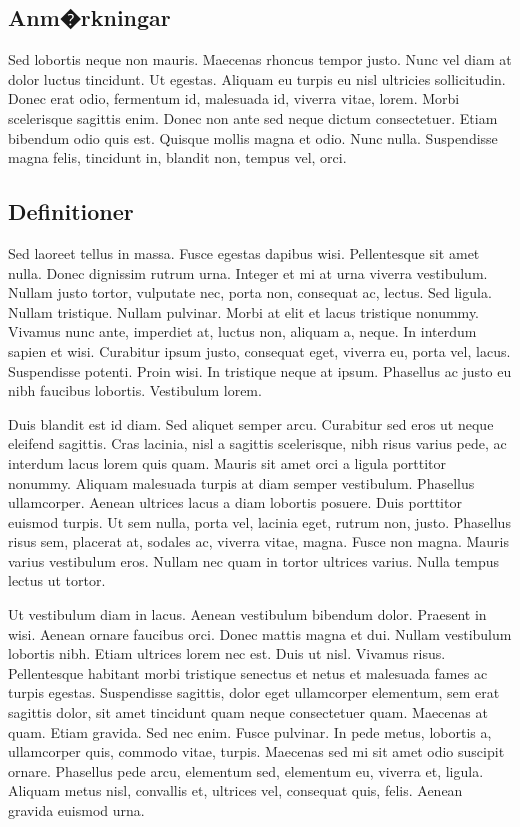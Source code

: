 \documentclass[a4paper,11pt]{kth-mag}
\begin{document}
\subsection{Anm�rkningar}

Sed lobortis neque non mauris. Maecenas rhoncus tempor justo. Nunc vel
diam at dolor luctus tincidunt. Ut egestas. Aliquam eu turpis eu nisl
ultricies sollicitudin. Donec erat odio, fermentum id, malesuada id,
viverra vitae, lorem. Morbi scelerisque sagittis enim. Donec non ante
sed neque dictum consectetuer. Etiam bibendum odio quis est. Quisque
mollis magna et odio. Nunc nulla. Suspendisse magna felis, tincidunt
in, blandit non, tempus vel, orci.

\subsection{Definitioner}

Sed laoreet tellus in massa. Fusce egestas dapibus wisi. Pellentesque
sit amet nulla. Donec dignissim rutrum urna. Integer et mi at urna
viverra vestibulum. Nullam justo tortor, vulputate nec, porta non,
consequat ac, lectus. Sed ligula. Nullam tristique. Nullam pulvinar.
Morbi at elit et lacus tristique nonummy. Vivamus nunc ante, imperdiet
at, luctus non, aliquam a, neque. In interdum sapien et wisi.
Curabitur ipsum justo, consequat eget, viverra eu, porta vel, lacus.
Suspendisse potenti. Proin wisi. In tristique neque at ipsum.
Phasellus ac justo eu nibh faucibus lobortis. Vestibulum lorem.

Duis blandit est id diam. Sed aliquet semper arcu. Curabitur sed eros
ut neque eleifend sagittis. Cras lacinia, nisl a sagittis scelerisque,
nibh risus varius pede, ac interdum lacus lorem quis quam. Mauris sit
amet orci a ligula porttitor nonummy. Aliquam malesuada turpis at diam
semper vestibulum. Phasellus ullamcorper. Aenean ultrices lacus a diam
lobortis posuere. Duis porttitor euismod turpis. Ut sem nulla, porta
vel, lacinia eget, rutrum non, justo. Phasellus risus sem, placerat
at, sodales ac, viverra vitae, magna. Fusce non magna. Mauris varius
vestibulum eros. Nullam nec quam in tortor ultrices varius. Nulla
tempus lectus ut tortor.

Ut vestibulum diam in lacus. Aenean vestibulum bibendum dolor.
Praesent in wisi. Aenean ornare faucibus orci. Donec mattis magna et
dui. Nullam vestibulum lobortis nibh. Etiam ultrices lorem nec est.
Duis ut nisl. Vivamus risus. Pellentesque habitant morbi tristique
senectus et netus et malesuada fames ac turpis egestas. Suspendisse
sagittis, dolor eget ullamcorper elementum, sem erat sagittis dolor,
sit amet tincidunt quam neque consectetuer quam. Maecenas at quam.
Etiam gravida. Sed nec enim. Fusce pulvinar. In pede metus, lobortis
a, ullamcorper quis, commodo vitae, turpis. Maecenas sed mi sit amet
odio suscipit ornare. Phasellus pede arcu, elementum sed, elementum
eu, viverra et, ligula. Aliquam metus nisl, convallis et, ultrices
vel, consequat quis, felis. Aenean gravida euismod urna.
\end{document}
